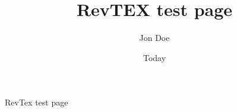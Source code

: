 \documentclass[aps,pre,superscriptaddress,amssymb,showpacs,onecolumn]{revtex4-1}
\begin{document}
\title{RevTEX test page}
\author{Jon Doe}
\date{Today}
\maketitle

RevTex test page


\nocite{*}
{}

\end{document}
